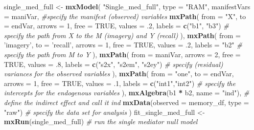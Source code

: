 \documentclass[11pt,]{article}
\newenvironment{Shaded}{\begin{snugshade}}{\end{snugshade}}
\newcommand{\CommentTok}[1]{\textcolor[rgb]{0.56,0.35,0.01}{\textit{#1}}}
\newcommand{\DataTypeTok}[1]{\textcolor[rgb]{0.13,0.29,0.53}{#1}}
\newcommand{\DecValTok}[1]{\textcolor[rgb]{0.00,0.00,0.81}{#1}}
\newcommand{\FloatTok}[1]{\textcolor[rgb]{0.00,0.00,0.81}{#1}}
\newcommand{\KeywordTok}[1]{\textcolor[rgb]{0.13,0.29,0.53}{\textbf{#1}}}
\newcommand{\NormalTok}[1]{#1}
\newcommand{\OperatorTok}[1]{\textcolor[rgb]{0.81,0.36,0.00}{\textbf{#1}}}
\newcommand{\OtherTok}[1]{\textcolor[rgb]{0.56,0.35,0.01}{#1}}
\newcommand{\StringTok}[1]{\textcolor[rgb]{0.31,0.60,0.02}{#1}}
\begin{document}
\begin{Shaded}
\begin{Highlighting}[]
\NormalTok{single_med_full <-}\StringTok{ }\KeywordTok{mxModel}\NormalTok{(}
  \StringTok{"Single_med_full"}\NormalTok{,}
  \DataTypeTok{type =} \StringTok{"RAM"}\NormalTok{,}
  \DataTypeTok{manifestVars =}\NormalTok{ maniVar,}
  \CommentTok{#specify the manifest (observed) variables}
  \KeywordTok{mxPath}\NormalTok{(}
    \DataTypeTok{from =} \StringTok{"X"}\NormalTok{,}
    \DataTypeTok{to =}\NormalTok{ endVar,}
    \DataTypeTok{arrows =} \DecValTok{1}\NormalTok{,}
    \DataTypeTok{free =} \OtherTok{TRUE}\NormalTok{,}
    \DataTypeTok{values =} \FloatTok{.2}\NormalTok{,}
    \DataTypeTok{labels =} \KeywordTok{c}\NormalTok{(}\StringTok{"b1"}\NormalTok{, }\StringTok{"b3"}\NormalTok{) }\CommentTok{# specify the path from X to the M (imagery) and Y (recall)}
\NormalTok{  ),}
  \KeywordTok{mxPath}\NormalTok{(}
    \DataTypeTok{from =} \StringTok{'imagery'}\NormalTok{,}
    \DataTypeTok{to =} \StringTok{'recall'}\NormalTok{,}
    \DataTypeTok{arrows =} \DecValTok{1}\NormalTok{,}
    \DataTypeTok{free =} \OtherTok{TRUE}\NormalTok{,}
    \DataTypeTok{values =} \FloatTok{.2}\NormalTok{,}
    \DataTypeTok{labels =} \StringTok{"b2"} \CommentTok{# specify the path from M to Y}
\NormalTok{  ),}
  \KeywordTok{mxPath}\NormalTok{(}
    \DataTypeTok{from =}\NormalTok{ maniVar,}
    \DataTypeTok{arrows =} \DecValTok{2}\NormalTok{,}
    \DataTypeTok{free =} \OtherTok{TRUE}\NormalTok{,}
    \DataTypeTok{values =} \FloatTok{.8}\NormalTok{,}
    \DataTypeTok{labels =} \KeywordTok{c}\NormalTok{(}\StringTok{"s2x"}\NormalTok{, }\StringTok{"s2em"}\NormalTok{, }\StringTok{"s2ey"}\NormalTok{) }\CommentTok{# specify (residual) variances for the observed variables}
\NormalTok{  ),}
  \KeywordTok{mxPath}\NormalTok{(}
    \DataTypeTok{from =} \StringTok{"one"}\NormalTok{,}
    \DataTypeTok{to =}\NormalTok{ endVar,}
    \DataTypeTok{arrows =} \DecValTok{1}\NormalTok{,}
    \DataTypeTok{free =} \OtherTok{TRUE}\NormalTok{,}
    \DataTypeTok{values =} \FloatTok{.1}\NormalTok{, }
    \DataTypeTok{labels =} \KeywordTok{c}\NormalTok{(}\StringTok{"int1"}\NormalTok{,}\StringTok{"int2"}\NormalTok{) }\CommentTok{# specify the intercepts for the endogenous variables}
\NormalTok{  ),}
  \KeywordTok{mxAlgebra}\NormalTok{(b1 }\OperatorTok{*}\StringTok{ }\NormalTok{b2, }\DataTypeTok{name =} \StringTok{"ind"}\NormalTok{), }\CommentTok{# define the indirect effect and call it ind}
  \KeywordTok{mxData}\NormalTok{(}\DataTypeTok{observed =}\NormalTok{ memory_df, }\DataTypeTok{type =} \StringTok{"raw"}\NormalTok{) }\CommentTok{# specify the data set for analysis}
\NormalTok{)}
\NormalTok{fit_single_med_full <-}\StringTok{ }\KeywordTok{mxRun}\NormalTok{(single_med_full) }\CommentTok{# run the single mediator null model}
\end{Highlighting}
\end{Shaded}
\end{document}
